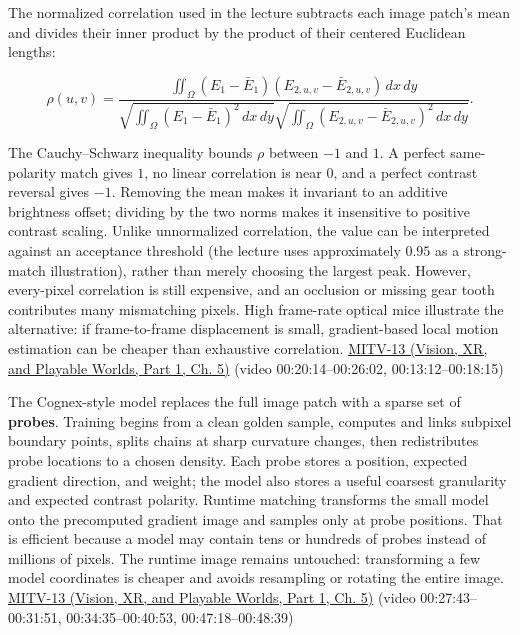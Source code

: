 The normalized correlation used in the lecture subtracts each image patch's mean and divides their inner product by the product of their centered Euclidean lengths:

\[
\rho(u,v)=\frac{\iint_\Omega (E_1-\bar E_1)(E_{2,u,v}-\bar E_{2,u,v})\,dx\,dy}{\sqrt{\iint_\Omega(E_1-\bar E_1)^2\,dx\,dy}\sqrt{\iint_\Omega(E_{2,u,v}-\bar E_{2,u,v})^2\,dx\,dy}}.
\]

The Cauchy--Schwarz inequality bounds \(\rho\) between \(-1\) and \(1\). A perfect same-polarity match gives \(1\), no linear correlation is near \(0\), and a perfect contrast reversal gives \(-1\). Removing the mean makes it invariant to an additive brightness offset; dividing by the two norms makes it insensitive to positive contrast scaling. Unlike unnormalized correlation, the value can be interpreted against an acceptance threshold (the lecture uses approximately \(0.95\) as a strong-match illustration), rather than merely choosing the largest peak. However, every-pixel correlation is still expensive, and an occlusion or missing gear tooth contributes many mismatching pixels. High frame-rate optical mice illustrate the alternative: if frame-to-frame displacement is small, gradient-based local motion estimation can be cheaper than exhaustive correlation. \href{../07-Vision-XR-and-Playable-Worlds-P01/main.pdf\#nameddest=04-visual-computing-ii-ch036-mitv-13---object-detection-recognition-and-pose-determination-patquick-us-7016539}{MITV-13 (Vision, XR, and Playable Worlds, Part 1, Ch. 5)} (video 00:20:14--00:26:02, 00:13:12--00:18:15)

The Cognex-style model replaces the full image patch with a sparse set of \textbf{probes}. Training begins from a clean golden sample, computes and links subpixel boundary points, splits chains at sharp curvature changes, then redistributes probe locations to a chosen density. Each probe stores a position, expected gradient direction, and weight; the model also stores a useful coarsest granularity and expected contrast polarity. Runtime matching transforms the small model onto the precomputed gradient image and samples only at probe positions. That is efficient because a model may contain tens or hundreds of probes instead of millions of pixels. The runtime image remains untouched: transforming a few model coordinates is cheaper and avoids resampling or rotating the entire image. \href{../07-Vision-XR-and-Playable-Worlds-P01/main.pdf\#nameddest=04-visual-computing-ii-ch036-mitv-13---object-detection-recognition-and-pose-determination-patquick-us-7016539}{MITV-13 (Vision, XR, and Playable Worlds, Part 1, Ch. 5)} (video 00:27:43--00:31:51, 00:34:35--00:40:53, 00:47:18--00:48:39)

